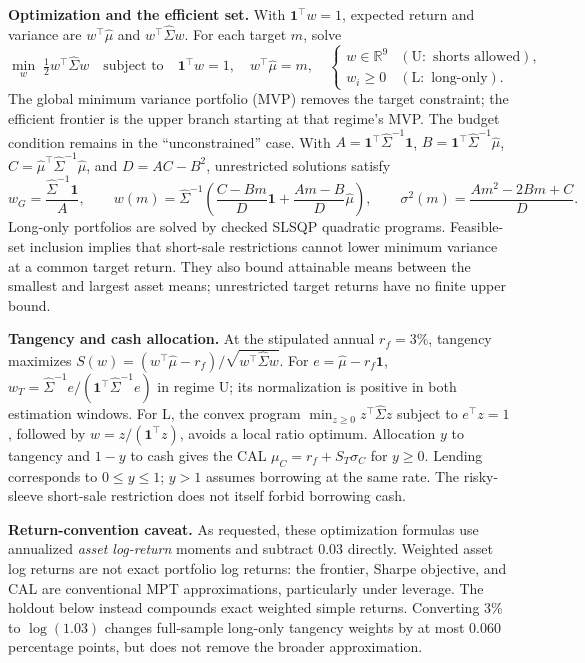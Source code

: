 \documentclass[10pt,a4paper]{article}
\newcommand{\ones}{\mathbf{1}}
\newcommand{\Sig}{\widehat{\Sigma}}
\begin{document}
\textbf{Optimization and the efficient set.} With $\ones^\top w=1$, expected return and variance are $w^\top\widehat\mu$ and $w^\top\Sig w$. For each target $m$, solve
\[
 \min_w\;\tfrac12w^\top\Sig w
 \quad\text{subject to}\quad \ones^\top w=1,\quad w^\top\widehat\mu=m,
 \quad \begin{cases}w\in\mathbb R^9 &(\mathrm{U}:\text{ shorts allowed}),\\
 w_i\ge0 &(\mathrm{L}:\text{ long-only}).\end{cases}
\]
The global minimum variance portfolio (MVP) removes the target constraint; the efficient frontier is the upper branch starting at that regime's MVP. The budget condition remains in the ``unconstrained'' case. With $A=\ones^\top\Sig^{-1}\ones$, $B=\ones^\top\Sig^{-1}\widehat\mu$, $C=\widehat\mu^\top\Sig^{-1}\widehat\mu$, and $D=AC-B^2$, unrestricted solutions satisfy
\[
 w_G=\frac{\Sig^{-1}\ones}{A},\qquad
 w(m)=\Sig^{-1}\!\left(\frac{C-Bm}{D}\ones+\frac{Am-B}{D}\widehat\mu\right),\qquad
 \sigma^2(m)=\frac{Am^2-2Bm+C}{D}.
\]
Long-only portfolios are solved by checked SLSQP quadratic programs. Feasible-set inclusion implies that short-sale restrictions cannot lower minimum variance at a common target return. They also bound attainable means between the smallest and largest asset means; unrestricted target returns have no finite upper bound.

\textbf{Tangency and cash allocation.} At the stipulated annual $r_f=3\%$, tangency maximizes $S(w)=(w^\top\widehat\mu-r_f)/\sqrt{w^\top\Sig w}$. For $e=\widehat\mu-r_f\ones$, $w_T=\Sig^{-1}e/(\ones^\top\Sig^{-1}e)$ in regime U; its normalization is positive in both estimation windows. For L, the convex program $\min_{z\ge0}z^\top\Sig z$ subject to $e^\top z=1$, followed by $w=z/(\ones^\top z)$, avoids a local ratio optimum. Allocation $y$ to tangency and $1-y$ to cash gives the CAL $\mu_C=r_f+S_T\sigma_C$ for $y\ge0$. Lending corresponds to $0\le y\le1$; $y>1$ assumes borrowing at the same rate. The risky-sleeve short-sale restriction does not itself forbid borrowing cash.

\textbf{Return-convention caveat.} As requested, these optimization formulas use annualized \emph{asset log-return} moments and subtract 0.03 directly. Weighted asset log returns are not exact portfolio log returns: the frontier, Sharpe objective, and CAL are conventional MPT approximations, particularly under leverage. The holdout below instead compounds exact weighted simple returns. Converting 3\% to $\log(1.03)$ changes full-sample long-only tangency weights by at most 0.060 percentage points, but does not remove the broader approximation.
\end{document}

